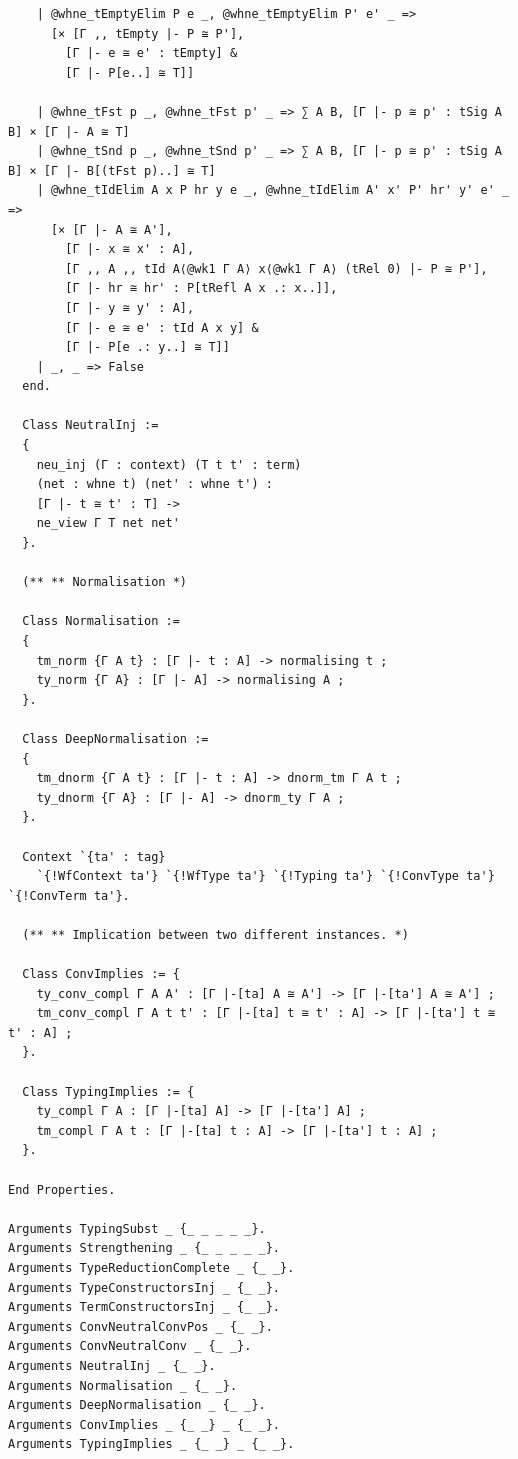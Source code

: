 \begin{lstlisting}
    | @whne_tEmptyElim P e _, @whne_tEmptyElim P' e' _ =>
      [× [Γ ,, tEmpty |- P ≅ P'],
        [Γ |- e ≅ e' : tEmpty] &
        [Γ |- P[e..] ≅ T]]
        
    | @whne_tFst p _, @whne_tFst p' _ => ∑ A B, [Γ |- p ≅ p' : tSig A B] × [Γ |- A ≅ T]
    | @whne_tSnd p _, @whne_tSnd p' _ => ∑ A B, [Γ |- p ≅ p' : tSig A B] × [Γ |- B[(tFst p)..] ≅ T]
    | @whne_tIdElim A x P hr y e _, @whne_tIdElim A' x' P' hr' y' e' _ =>
      [× [Γ |- A ≅ A'],
        [Γ |- x ≅ x' : A],
        [Γ ,, A ,, tId A⟨@wk1 Γ A⟩ x⟨@wk1 Γ A⟩ (tRel 0) |- P ≅ P'],
        [Γ |- hr ≅ hr' : P[tRefl A x .: x..]],
        [Γ |- y ≅ y' : A],
        [Γ |- e ≅ e' : tId A x y] &
        [Γ |- P[e .: y..] ≅ T]]
    | _, _ => False
  end.

  Class NeutralInj :=
  {
    neu_inj (Γ : context) (T t t' : term)
    (net : whne t) (net' : whne t') :
    [Γ |- t ≅ t' : T] ->
    ne_view Γ T net net'
  }.

  (** ** Normalisation *)

  Class Normalisation :=
  {
    tm_norm {Γ A t} : [Γ |- t : A] -> normalising t ;
    ty_norm {Γ A} : [Γ |- A] -> normalising A ;
  }.

  Class DeepNormalisation :=
  {
    tm_dnorm {Γ A t} : [Γ |- t : A] -> dnorm_tm Γ A t ;
    ty_dnorm {Γ A} : [Γ |- A] -> dnorm_ty Γ A ;
  }.

  Context `{ta' : tag}
    `{!WfContext ta'} `{!WfType ta'} `{!Typing ta'} `{!ConvType ta'} `{!ConvTerm ta'}.

  (** ** Implication between two different instances. *)

  Class ConvImplies := {
    ty_conv_compl Γ A A' : [Γ |-[ta] A ≅ A'] -> [Γ |-[ta'] A ≅ A'] ;
    tm_conv_compl Γ A t t' : [Γ |-[ta] t ≅ t' : A] -> [Γ |-[ta'] t ≅ t' : A] ;
  }.

  Class TypingImplies := {
    ty_compl Γ A : [Γ |-[ta] A] -> [Γ |-[ta'] A] ;
    tm_compl Γ A t : [Γ |-[ta] t : A] -> [Γ |-[ta'] t : A] ;
  }.

End Properties.

Arguments TypingSubst _ {_ _ _ _ _}.
Arguments Strengthening _ {_ _ _ _ _}.
Arguments TypeReductionComplete _ {_ _}.
Arguments TypeConstructorsInj _ {_ _}.
Arguments TermConstructorsInj _ {_ _}.
Arguments ConvNeutralConvPos _ {_ _}.
Arguments ConvNeutralConv _ {_ _}.
Arguments NeutralInj _ {_ _}.
Arguments Normalisation _ {_ _}.
Arguments DeepNormalisation _ {_ _}.
Arguments ConvImplies _ {_ _} _ {_ _}.
Arguments TypingImplies _ {_ _} _ {_ _}.
\end{lstlisting}

